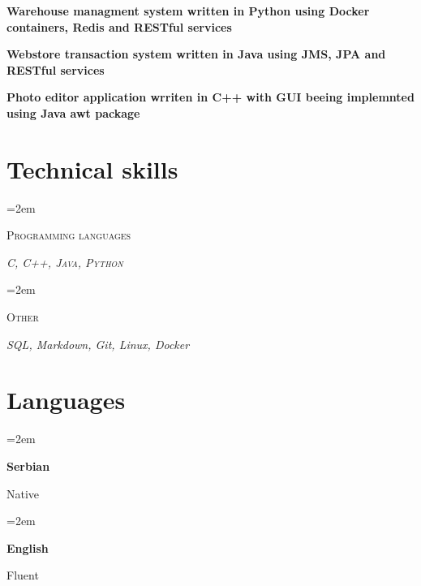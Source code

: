 \documentclass[12pt]{article}
\newlength{\spacebox}
\newcommand{\sepspace}{\vspace*{1em}}
\newcommand{\skill}[2]{
  \noindent\hangindent=2em\hangafter=0
  \parbox{3\spacebox}{%
    \textsc{#1}} %
  \textsl{#2} \par} %
\newcommand{\lan}[2]{
    \noindent\hangindent=2em\hangafter=0
    \parbox{\spacebox}{%
        \textbf{#1}} %
     #2 \par}    %
\newcommand{\project}[1]{

  \noindent  \textbf{#1}
  
\normalsize \par}
\begin{document}
\project{Warehouse managment system written in Python using Docker containers, Redis and RESTful services}

\project{Webstore transaction system written in Java using JMS, JPA and RESTful services}

\project{Photo editor application wrriten in C++ with GUI beeing implemnted using Java awt package}




\sepspace

\section*{Technical skills}

\skill{Programming languages}{
  \textsc{C}, \textsc{C++}, \textsc{Java}, \textsc{Python}}
\skill{Other}{
  \textsl{SQL, Markdown, Git, Linux, Docker}}

\section*{Languages}
\lan{Serbian}{Native}
\lan{English}{Fluent}
\end{document}
